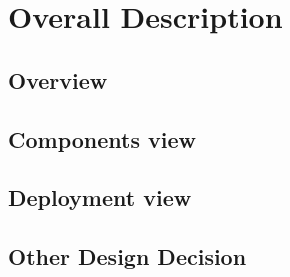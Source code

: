 \section{Overall Description}

\subsection{Overview}


\subsection{Components view}


\subsection{Deployment view}


\subsection{Other Design Decision}


% 

% 

% 

